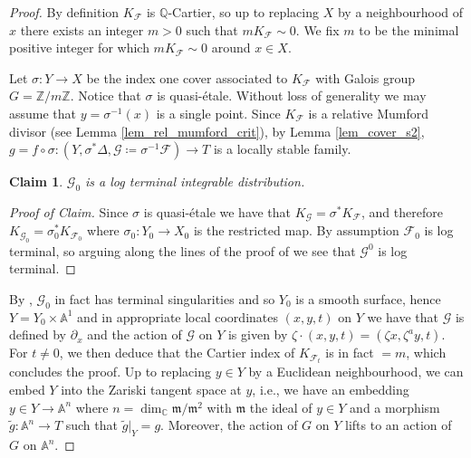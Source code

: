 \documentclass[12pt, a4paper]{amsart}
\newtheorem{claim}[theorem]{Claim}
\theoremstyle{definition}
\theoremstyle{named}
\begin{document}
\begin{proof}
By definition $K_{\mathcal F}$ is $\mathbb Q$-Cartier, so up to replacing $X$ by a neighbourhood of $x$ there exists an integer $m >0$ such that $mK_{\mathcal F} \sim 0$. 
We fix $m$ to be the minimal positive integer for which $mK_{\mathcal F} \sim 0$ around $x \in X$.

Let $\sigma\colon Y \rightarrow X$ be the index one cover associated to $K_{\mathcal F}$ with Galois group $G = \mathbb Z/m\mathbb Z$. Notice that $\sigma$ is quasi-\'etale.
Without loss of generality we may assume that $y = \sigma^{-1}(x)$ is a single point.
Since $K_{\mathcal F}$ is a relative Mumford divisor (see Lemma \ref{lem_rel_mumford_crit}), by Lemma \ref{lem_cover_s2}, $g = f\circ \sigma \colon  (Y, \sigma^*\Delta, \mathcal G \coloneqq \sigma^{-1}\mathcal F) \rightarrow T$ is a locally stable family.

\begin{claim}
\label{cl_lt}
    $\mathcal G_0$ is a log terminal integrable distribution.
\end{claim}
\begin{proof}[Proof of Claim]
Since $\sigma$ is quasi-\'etale we have that $K_{\mathcal G} = \sigma^*K_{\mathcal F}$, and 
therefore $K_{\mathcal G_0} = \sigma_0^*K_{\mathcal F_0}$ where $\sigma_0\colon Y_0 \rightarrow X_0$ is the restricted map.  
By assumption $\mathcal F_0$ is log terminal, so arguing along the lines of the proof of \cite[Proposition 5.30]{KM98}
we see that $\mathcal G^0$ is log terminal.
\end{proof}

By \cite[Fact III.i.1]{MP13}, $\mathcal G_0$ in fact has terminal singularities and so $Y_0$ is a smooth surface, hence $Y = Y_0\times \mathbb A^1$ and in appropriate local coordinates $(x, y, t)$ on $Y$ we have that $\mathcal G$ is defined by $\partial_x$ and the action of $\mathcal G$ on $Y$ is given by $\zeta \cdot (x, y, t) = (\zeta x, \zeta^a y, t)$.  For $t\neq 0$, we then deduce that the Cartier index of $K_{\mathcal F_t}$ is in fact $=m$, which concludes the proof.
\iffalse
Up to replacing $y \in Y$ by a Euclidean neighbourhood, we can embed $Y$ into the Zariski tangent space at $y$, i.e., we have an embedding $y \in Y \rightarrow \mathbb A^n$ where 
$n = \dim_{\mathbb C} \mathfrak m/\mathfrak m^2$ with $\mathfrak m$ the ideal of $y \in Y$ and a morphism  $\tilde{g}\colon \mathbb A^n \rightarrow T$ such that $\tilde{g}|_Y = g$.  Moreover, the action of $G$ on $Y$ lifts 
to an action of $G$ on $\mathbb A^n$.



\end{proof}
\end{document}
